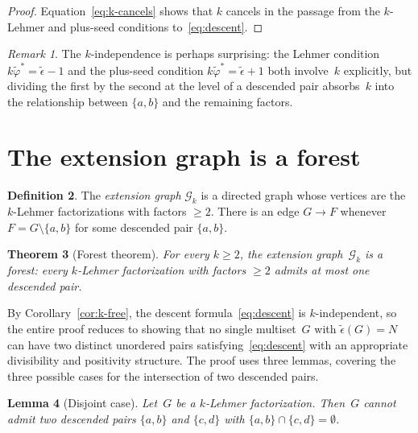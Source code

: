 \documentclass[11pt]{article}
\newtheorem{theorem}{Theorem}
\newtheorem{lemma}[theorem]{Lemma}
\theoremstyle{definition}
\newtheorem{definition}[theorem]{Definition}
\theoremstyle{remark}
\newtheorem{remark}[theorem]{Remark}
\newcommand{\eps}{\tilde{\epsilon}}
\newcommand{\phist}{\tilde{\varphi}^*}
\begin{document}
\begin{proof}
Equation~\eqref{eq:k-cancels} shows that $k$ cancels in the passage from
the $k$-Lehmer and plus-seed conditions to~\eqref{eq:descent}.
\end{proof}

\begin{remark}
The $k$-independence is perhaps surprising: the Lehmer condition $k\phist =
\eps - 1$ and the plus-seed condition $k\phist = \eps + 1$ both involve~$k$
explicitly, but dividing the first by the second at the level of a
descended pair absorbs~$k$ into the relationship between $\{a,b\}$ and
the remaining factors.
\end{remark}


\section{The extension graph is a forest}\label{sec:forest}

\begin{definition}
The \emph{extension graph} $\mathcal{G}_k$ is a directed graph whose
vertices are the $k$-Lehmer factorizations with factors $\ge 2$.  There is
an edge $G \to F$ whenever~$F = G \setminus \{a, b\}$ for some descended
pair $\{a, b\}$.
\end{definition}

\begin{theorem}[Forest theorem]\label{thm:forest}
For every $k \ge 2$, the extension graph~$\mathcal{G}_k$ is a forest:
every $k$-Lehmer factorization with factors $\ge 2$ admits at most one
descended pair.
\end{theorem}

By Corollary~\ref{cor:k-free}, the descent formula~\eqref{eq:descent} is
$k$-independent, so the entire proof reduces to showing that no single
multiset~$G$ with $\eps(G) = N$ can have two distinct unordered pairs
satisfying~\eqref{eq:descent} with an appropriate divisibility and
positivity structure.  The proof uses three lemmas, covering the three
possible cases for the intersection of two descended pairs.

\begin{lemma}[Disjoint case]\label{lem:disjoint}
Let~$G$ be a $k$-Lehmer factorization.  Then~$G$ cannot admit two
descended pairs $\{a,b\}$ and $\{c,d\}$ with
$\{a,b\} \cap \{c,d\} = \emptyset$.
\end{lemma}
\end{document}
